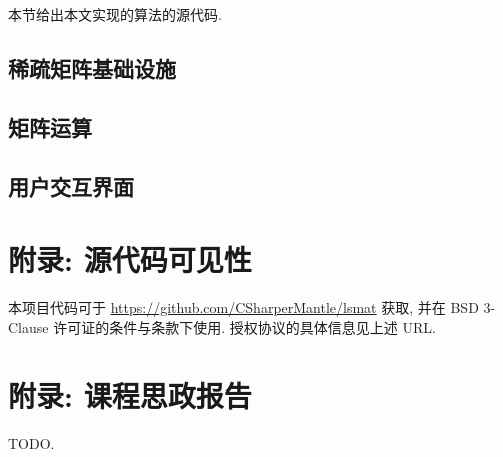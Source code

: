 本节给出本文实现的算法的源代码.

\subsection{稀疏矩阵基础设施}





\subsection{矩阵运算}





\subsection{用户交互界面}



\section{附录: 源代码可见性}
\label{appendix_source_code}

本项目代码可于 \url{https://github.com/CSharperMantle/lsmat} 获取, 并在 BSD 3-Clause 许可证的条件与条款下使用. 授权协议的具体信息见上述 URL.

\section{附录: 课程思政报告}

TODO.
